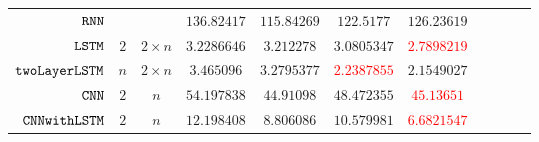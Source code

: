{\begin {table}[H]
\begin{center}
{\begin{tabular}{| >{\tiny}r | c | c | c | c | c | c | c | c | c | c  }
         $  \mathtt{RNN}$           & $  $  & $ $ &  $ 136.82417 $  &  $ 115.84269 $ & $ 122.5177 $ & $ 126.23619 $  \\
         $  \mathtt{LSTM}$          & $ 2 $   &  $ 2 \times n $  &  $ 3.2286646  $  &  $ 3.212278 $ & $3.0805347$ & \textcolor{red}{${2.7898219}$}  \\
         $  \mathtt{twoLayerLSTM}$  & $ n $ &  $ 2 \times n $  &  $ 3.465096  $  &  $3.2795377$ & \textcolor{red}{${2.2387855}$} & $2.1549027$  \\
         $ \mathtt{CNN}$ & $2$ &  $ n $ &  $54.197838$  &  $44.91098$ & $48.472355$ & \textcolor{red}{$45.13651$}  \\
         $ \mathtt{CNNwithLSTM}$ & $2$ &  $ n $ &  $ 12.198408  $  &  $  8.806086$ & $ 10.579981 $ & \textcolor{red}{$ 6.6821547 $} \\
         \hline \hline
        \end{tabular}
}
\end{center}
\end{table}
}


